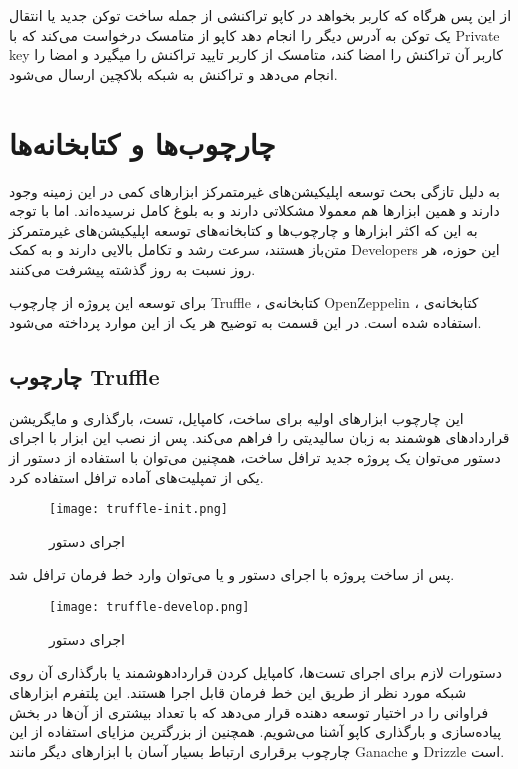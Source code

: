 از این پس هرگاه که کاربر بخواهد در کاپو تراکنشی از جمله ساخت توکن جدید یا انتقال یک توکن به آدرس دیگر را انجام دهد کاپو از متامسک درخواست می‌کند که با
\gls{Private key}
کاربر آن تراکنش را امضا کند، متامسک از کاربر تایید تراکنش را میگیرد و امضا را انجام می‌دهد و تراکنش به شبکه بلاکچین ارسال می‌شود.


\section{چارچوب‌ها و کتابخانه‌ها}
به دلیل تازگی بحث توسعه اپلیکیشن‌های غیرمتمرکز ابزارهای کمی در این زمینه وجود دارند و همین ابزارها هم معمولا مشکلاتی دارند و به بلوغ کامل نرسیده‌اند. اما با توجه به این که اکثر ابزارها و چارچوب‌ها و کتابخانه‌های توسعه اپلیکیشن‌های غیرمتمرکز متن‌باز هستند، سرعت رشد و تکامل بالایی دارند و به کمک
\glspl{Developer}
این حوزه، هر روز نسبت به روز گذشته پیشرفت می‌کنند.

برای توسعه این پروژه از
چارچوب Truffle
،
کتابخانه‌ی OpenZeppelin
،
کتابخانه‌ی
استفاده شده است. در این قسمت به توضیح هر یک از این موارد پرداخته می‌شود.

\subsection{چارچوب Truffle}
این چارچوب ابزارهای اولیه برای ساخت، کامپایل، تست، بارگذاری و مایگریشن قراردادهای هوشمند به زبان سالیدیتی را فراهم می‌کند. پس از نصب این ابزار با اجرای دستور
می‌توان یک پروژه جدید ترافل ساخت، همچنین می‌توان با استفاده از دستور
از یکی از تمپلیت‌های آماده ترافل استفاده کرد.

\begin{figure}[ht]
\centerline{\texttt{[image: truffle-init.png]}}
\caption{اجرای دستور }
\label{fig:truffle-init}
\end{figure}

پس از ساخت پروژه با اجرای دستور
و یا
 می‌توان وارد خط فرمان ترافل شد.

\begin{figure}[ht]
\centerline{\texttt{[image: truffle-develop.png]}}
\caption{اجرای دستور }
\label{fig:truffle-develop}
\end{figure}

دستورات لازم برای اجرای تست‌ها، کامپایل کردن قراردادهوشمند یا بارگذاری آن روی شبکه مورد نظر از طریق این خط فرمان قابل اجرا هستند. این پلتفرم ابزارهای فراوانی را در اختیار توسعه دهنده قرار می‌دهد که با تعداد بیشتری از آن‌ها در بخش پیاده‌سازی و بارگذاری کاپو آشنا می‌شویم. همچنین از بزرگترین مزایای استفاده از این چارچوب برقراری ارتباط بسیار آسان با ابزارهای دیگر مانند Ganache و Drizzle است.

